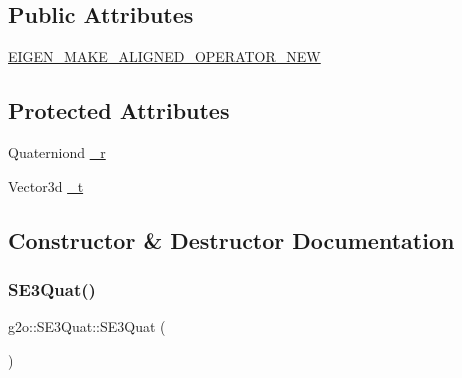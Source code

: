 \subsection*{Public Attributes}
\begin{DoxyCompactItemize}
\item 
\mbox{\hyperlink{classg2o_1_1_s_e3_quat_a5bcd64993957b1a87a113d9a282d4fcb}{E\+I\+G\+E\+N\+\_\+\+M\+A\+K\+E\+\_\+\+A\+L\+I\+G\+N\+E\+D\+\_\+\+O\+P\+E\+R\+A\+T\+O\+R\+\_\+\+N\+EW}}
\end{DoxyCompactItemize}
\subsection*{Protected Attributes}
\begin{DoxyCompactItemize}
\item 
Quaterniond \mbox{\hyperlink{classg2o_1_1_s_e3_quat_a420255bcfca499dc2669b27fd373f665}{\+\_\+r}}
\item 
Vector3d \mbox{\hyperlink{classg2o_1_1_s_e3_quat_a7f0078e2750e8f821926f2d51202a809}{\+\_\+t}}
\end{DoxyCompactItemize}


\subsection{Constructor \& Destructor Documentation}
\mbox{\label{classg2o_1_1_s_e3_quat_a685de01e417e01f84d5b8389e5f5f333}} 
\subsubsection{\texorpdfstring{S\+E3\+Quat()}{SE3Quat()}\hspace{0.1cm}{\footnotesize\ttfamily [1/4]}}
{\footnotesize\ttfamily g2o\+::\+S\+E3\+Quat\+::\+S\+E3\+Quat (\begin{DoxyParamCaption}{ }\end{DoxyParamCaption})\hspace{0.3cm}{\ttfamily [inline]}}

\mbox{\label{classg2o_1_1_s_e3_quat_abb3e9184aa02bf6ced3f6d4cd0825f33}} 
